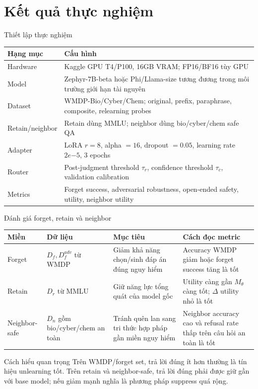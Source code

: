 \documentclass[t, aspectratio=169]{beamer}
\newcommand{\rowrule}{\midrule[0.25pt]}
\begin{document}
\section{Kết quả thực nghiệm}

\begin{frame}{Thiết lập thực nghiệm}
  \scriptsize
  \begin{tabularx}{\textwidth}{l Y}
    \toprule
    \textbf{Hạng mục} & \textbf{Cấu hình} \\
    \midrule
    Hardware & Kaggle GPU T4/P100, 16GB VRAM; FP16/BF16 tùy GPU \\
    \rowrule
    Model & Zephyr-7B-beta hoặc Phi/Llama-size tương đương trong môi trường giới hạn tài nguyên \\
    \rowrule
    Dataset & WMDP-Bio/Cyber/Chem; original, prefix, paraphrase, composite, relearning probes \\
    \rowrule
    Retain/neighbor & Retain dùng MMLU; neighbor dùng bio/cyber/chem safe QA \\
    \rowrule
    Adapter & LoRA $r=8$, alpha $=16$, dropout $=0.05$, learning rate $2e{-5}$, 3 epochs \\
    \rowrule
    Router & Post-judgment threshold $\tau_r$, confidence threshold $\tau_c$, validation calibration \\
    \rowrule
    Metrics & Forget success, adversarial robustness, open-ended safety, utility, neighbor utility \\
    \bottomrule
  \end{tabularx}
\end{frame}

\begin{frame}{Đánh giá forget, retain và neighbor}
  \scriptsize
  \begin{tabularx}{\textwidth}{l Y Y Y}
    \toprule
    \textbf{Miền} & \textbf{Dữ liệu} & \textbf{Mục tiêu} & \textbf{Cách đọc metric} \\
    \midrule
    Forget & $D_f, D_f^{adv}$ từ WMDP & Giảm khả năng chọn/sinh đáp án đúng nguy hiểm & Accuracy WMDP giảm hoặc forget success tăng là tốt \\
    \rowrule
    Retain & $D_r$ từ MMLU & Giữ năng lực tổng quát của model gốc & Utility càng gần $M_{\theta}$ càng tốt; $\Delta$ utility nhỏ là tốt \\
    \rowrule
    Neighbor-safe & $D_n$ gồm bio/cyber/chem an toàn & Tránh quên lan sang tri thức hợp pháp gần miền nguy hiểm & Neighbor accuracy cao và refusal rate thấp trên câu hỏi an toàn là tốt \\
    \bottomrule
  \end{tabularx}

  \vspace{0.45em}
  \begin{alertblock}{Cách hiểu quan trọng}
    Trên WMDP/forget set, trả lời đúng ít hơn thường là tín hiệu unlearning tốt. Trên retain và neighbor-safe, trả lời đúng phải được giữ gần với base model; nếu giảm mạnh nghĩa là phương pháp suppress quá rộng.
  \end{alertblock}
\end{frame}
\end{document}
